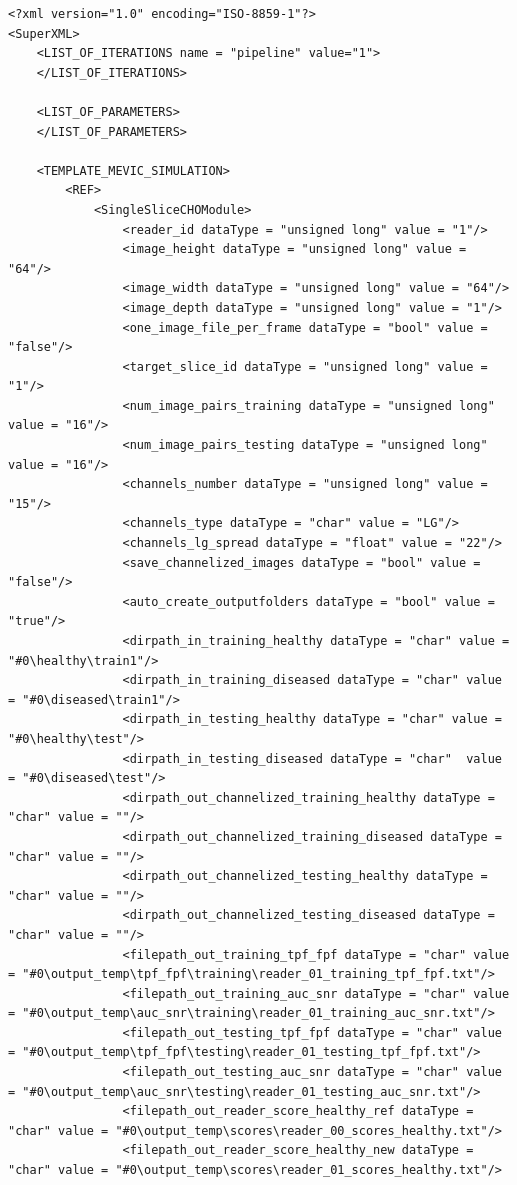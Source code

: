 \lstset{language=XML}
\begin{lstlisting}
<?xml version="1.0" encoding="ISO-8859-1"?>
<SuperXML>
	<LIST_OF_ITERATIONS name = "pipeline" value="1">	
	</LIST_OF_ITERATIONS>
	
	<LIST_OF_PARAMETERS>
	</LIST_OF_PARAMETERS>

	<TEMPLATE_MEVIC_SIMULATION>
		<REF>
			<SingleSliceCHOModule>
				<reader_id dataType = "unsigned long" value = "1"/>
				<image_height dataType = "unsigned long" value = "64"/>
				<image_width dataType = "unsigned long" value = "64"/>
				<image_depth dataType = "unsigned long" value = "1"/>
				<one_image_file_per_frame dataType = "bool" value = "false"/>
				<target_slice_id dataType = "unsigned long" value = "1"/>
				<num_image_pairs_training dataType = "unsigned long" value = "16"/>
				<num_image_pairs_testing dataType = "unsigned long" value = "16"/>
				<channels_number dataType = "unsigned long" value = "15"/>	
				<channels_type dataType = "char" value = "LG"/>
				<channels_lg_spread dataType = "float" value = "22"/>
				<save_channelized_images dataType = "bool" value = "false"/>
				<auto_create_outputfolders dataType = "bool" value = "true"/>
				<dirpath_in_training_healthy dataType = "char" value = "#0\healthy\train1"/>
				<dirpath_in_training_diseased dataType = "char" value = "#0\diseased\train1"/>
				<dirpath_in_testing_healthy dataType = "char" value = "#0\healthy\test"/>
				<dirpath_in_testing_diseased dataType = "char"  value = "#0\diseased\test"/>
				<dirpath_out_channelized_training_healthy dataType = "char" value = ""/>
				<dirpath_out_channelized_training_diseased dataType = "char" value = ""/>
				<dirpath_out_channelized_testing_healthy dataType = "char" value = ""/>
				<dirpath_out_channelized_testing_diseased dataType = "char" value = ""/>
				<filepath_out_training_tpf_fpf dataType = "char" value = "#0\output_temp\tpf_fpf\training\reader_01_training_tpf_fpf.txt"/>
				<filepath_out_training_auc_snr dataType = "char" value = "#0\output_temp\auc_snr\training\reader_01_training_auc_snr.txt"/>
				<filepath_out_testing_tpf_fpf dataType = "char" value = "#0\output_temp\tpf_fpf\testing\reader_01_testing_tpf_fpf.txt"/>
				<filepath_out_testing_auc_snr dataType = "char" value = "#0\output_temp\auc_snr\testing\reader_01_testing_auc_snr.txt"/>
				<filepath_out_reader_score_healthy_ref dataType = "char" value = "#0\output_temp\scores\reader_00_scores_healthy.txt"/>
				<filepath_out_reader_score_healthy_new dataType = "char" value = "#0\output_temp\scores\reader_01_scores_healthy.txt"/>

\end{lstlisting}
